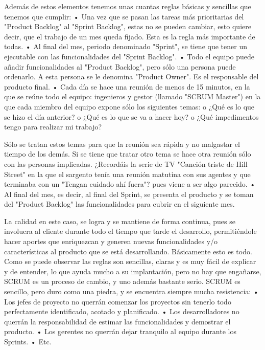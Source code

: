 Además de estos elementos tenemos unas cuantas reglas básicas y sencillas que
tenemos que cumplir:
    •   Una vez que se pasan las tareas más prioritarias del "Product Backlog" al
        "Sprint Backlog", estas no se pueden cambiar, esto quiere decir, que el trabajo
        de un mes queda fijado. Esta es la regla más importante de todas.
    •   Al final del mes, periodo denominado "Sprint", se tiene que tener un ejecutable
        con las funcionalidades del "Sprint Backlog".
    •   Todo el equipo puede añadir funcionalidades al "Product Backlog", pero sólo
        una persona puede ordenarlo. A esta persona se le denomina "Product
        Owner". Es el responsable del producto final.
    •   Cada día se hace una reunión de menos de 15 minutos, en la que se reúne
        todo el equipo: ingenieros y gestor (llamado "SCRUM Master") en la que cada
        miembro del equipo expone sólo los siguientes temas:
             o ¿Qué es lo que se hizo el día anterior?
             o ¿Qué es lo que se va a hacer hoy?
             o ¿Qué impedimentos tengo para realizar mi trabajo?


        Sólo se tratan estos temas para que la reunión sea rápida y no malgastar el
        tiempo de los demás. Si se tiene que tratar otro tema se hace otra reunión sólo
        con las personas implicadas. ¿Recordáis la serie de TV "Canción triste de Hill
        Street" en la que el sargento tenía una reunión matutina con sus agentes y que
        terminaba con un "Tengan cuidado ahí fuera"? pues viene a ser algo parecido.
    •   Al final del mes, es decir, al final del Sprint, se presenta el producto y se toman
        del "Product Backlog" las funcionalidades para cubrir en el siguiente mes.

La calidad en este caso, se logra y se mantiene de forma continua, pues se involucra
al cliente durante todo el tiempo que tarde el desarrollo, permitiéndole hacer aportes
que enriquezcan y generen nuevas funcionalidades y/o características al producto que
se está desarrollando.
Básicamente esto es todo.
Como se puede observar las reglas son sencillas, claras y es muy fácil de explicar y de
entender, lo que ayuda mucho a su implantación, pero no hay que engañarse, SCRUM
es un proceso de cambio, y uno además bastante serio.
SCRUM es sencillo, pero duro como una piedra, y se encuentra siempre mucha
resistencia:
    •   Los jefes de proyecto no querrán comenzar los proyectos sin tenerlo todo
        perfectamente identificado, acotado y planificado.
    •   Los desarrolladores no querrán la               responsabilidad    de  estimar   las
        funcionalidades y demostrar el producto.
    •   Los gerentes no querrán dejar tranquilo al equipo durante los Sprints.
    •   Etc.

